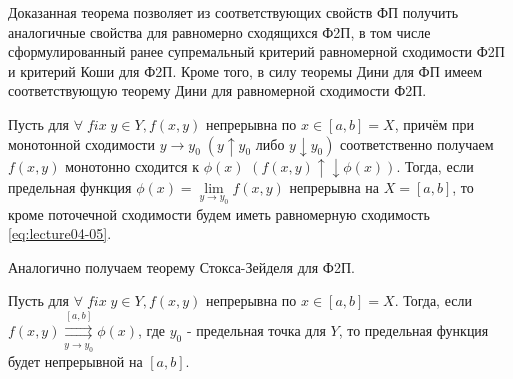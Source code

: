 \begin{notes}
	\item Доказанная теорема позволяет из соответствующих свойств ФП получить аналогичные свойства для равномерно сходящихся Ф2П, в том числе сформулированный ранее супремальный критерий равномерной сходимости Ф2П и критерий Коши для Ф2П. Кроме того, в силу теоремы Дини	для ФП имеем соответствующую теорему Дини для равномерной сходимости Ф2П.

	\begin{theorem}
		Пусть для $\forall \; fix \; y \in Y, f(x,y)$ непрерывна по $x \in [a,b] = X$, причём при монотонной сходимости \newline $y \to y_0 \; (y \uparrow y_0 \text{ либо } y \downarrow y_0)$ соответственно получаем	$f(x,y)$ монотонно сходится к $\phi(x)$ $\left(f(x,y) \uparrow \downarrow \phi(x)\right)$. Тогда, если предельная функция $\phi(x) = \lim\limits_{y \to y_0} f(x,y)$ непрерывна на $X = [a,b]$, то кроме поточечной сходимости будем иметь равномерную сходимость \eqref{eq:lecture04-05}.
	\end{theorem}
	\item 	Аналогично получаем теорему	Стокса-Зейделя для Ф2П.

	\begin{theorem}
		Пусть для $\forall \; fix \; y \in Y, f(x,y)$ непрерывна по $x \in [a,b] = X$.
		Тогда, если $ f(x,y) \overset{[a,b]}{\underset{y \to y_0}{\rightrightarrows}}  \phi(x)$, где $y_0$ - предельная точка для $Y$, то предельная функция будет непрерывной на $[a,b]$.
	\end{theorem}
\end{notes}
